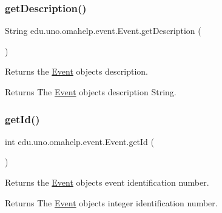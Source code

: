 \subsubsection{\texorpdfstring{get\+Description()}{getDescription()}}
{\footnotesize\ttfamily String edu.\+uno.\+omahelp.\+event.\+Event.\+get\+Description (\begin{DoxyParamCaption}{ }\end{DoxyParamCaption})}

Returns the \mbox{\hyperlink{classedu_1_1uno_1_1omahelp_1_1event_1_1_event}{Event}} object\textquotesingle{}s description.

\begin{DoxyReturn}{Returns}
The \mbox{\hyperlink{classedu_1_1uno_1_1omahelp_1_1event_1_1_event}{Event}} object\textquotesingle{}s description String. 
\end{DoxyReturn}
\mbox{\label{classedu_1_1uno_1_1omahelp_1_1event_1_1_event_a12880cf4efe7977b164b79c6b2452783}} 
\subsubsection{\texorpdfstring{get\+Id()}{getId()}}
{\footnotesize\ttfamily int edu.\+uno.\+omahelp.\+event.\+Event.\+get\+Id (\begin{DoxyParamCaption}{ }\end{DoxyParamCaption})}

Returns the \mbox{\hyperlink{classedu_1_1uno_1_1omahelp_1_1event_1_1_event}{Event}} object\textquotesingle{}s event identification number.

\begin{DoxyReturn}{Returns}
The \mbox{\hyperlink{classedu_1_1uno_1_1omahelp_1_1event_1_1_event}{Event}} object\textquotesingle{}s integer identification number. 
\end{DoxyReturn}
\mbox{\label{classedu_1_1uno_1_1omahelp_1_1event_1_1_event_a9d64fe6ffae57447917cffd0baa96f97}} 
